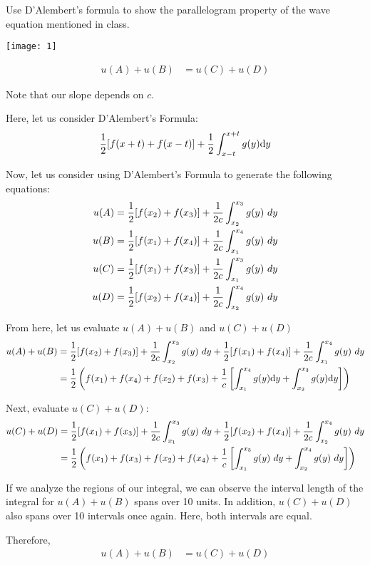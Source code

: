 \item Use D'Alembert's formula to show the parallelogram property of the wave equation mentioned in class.
\bigbreak

\begin{center}
  \texttt{[image: 1]}
\end{center}
%
\begin{align}
  u(A) + u(B) & = u(C) + u(D)
\end{align}

Note that our slope depends on $c$.

Here, let us consider D'Alembert's Formula:
%
\begin{align}
  \frac{1}{2}[f(x + t) + f(x - t)] + \frac{1}{2} \int^{x + t}_{x - t} g(y)
  \text dy
\end{align}

Now, let us consider using D'Alembert's Formula to generate the following equations:
%
\begin{align}
  u(A) & = \frac{1}{2} [f(x_2) + f(x_3)] + \frac{1}{2c} \int^{x_3}_{x_2} g(y) \text\ dy\\
  u(B) & = \frac{1}{2} [f(x_1) + f(x_4)] + \frac{1}{2c} \int^{x_4}_{x_1} g(y) \text\ dy\\
  u(C) & = \frac{1}{2} [f(x_1) + f(x_3)] + \frac{1}{2c} \int^{x_3}_{x_1} g(y) \text\ dy\\
  u(D) & = \frac{1}{2} [f(x_2) + f(x_4)] + \frac{1}{2c} \int^{x_4}_{x_2} g(y) \text\ dy
\end{align}

From here, let us evaluate $u(A) + u(B)$ and $u(C) + u(D)$
%
\begin{align}
  u(A) + u(B) & =
  \frac{1}{2} [f(x_2) + f(x_3)] + \frac{1}{2c} \int^{x_3}_{x_2} g(y) \text\ dy +
  \frac{1}{2} [f(x_1) + f(x_4)] + \frac{1}{2c} \int^{x_4}_{x_1} g(y) \text\ dy\\
  & =
  \frac{1}{2} \left( f(x_1) + f(x_4) + f(x_2) + f(x_3) +
  \frac{1}{c}\left[
  \int^{x_4}_{x_1} g(y) \text dy + \int^{x_3}_{x_2} g(y) \text dy
  \right]\right)
\end{align}

Next, evaluate $u(C) + u(D)$:
%
\begin{align}
  u(C) + u(D) & =
  \frac{1}{2} [f(x_1) + f(x_3)] + \frac{1}{2c} \int^{x_3}_{x_1} g(y) \text\ dy  +
  \frac{1}{2} [f(x_2) + f(x_4)] + \frac{1}{2c} \int^{x_4}_{x_2} g(y) \text\ dy \\
  & = \frac{1}{2}
  \left(
  f(x_1) + f(x_3) + f(x_2) + f(x_4) + \frac{1}{c}
  \left[
  \int^{x_3}_{x_1} g(y) \text\ dy +
  \int^{x_4}_{x_2} g(y) \text\ dy
  \right]
  \right)
\end{align}

If we analyze the regions of our integral, we can observe the interval length of the integral for $u(A) + u(B)$ spans over 10 units. In addition, $u(C) + u(D)$ also spans over 10 intervals once again. Here, both intervals are equal.

Therefore,
%
\begin{align}
  u(A) + u(B) & = u(C) + u(D)
\end{align}
